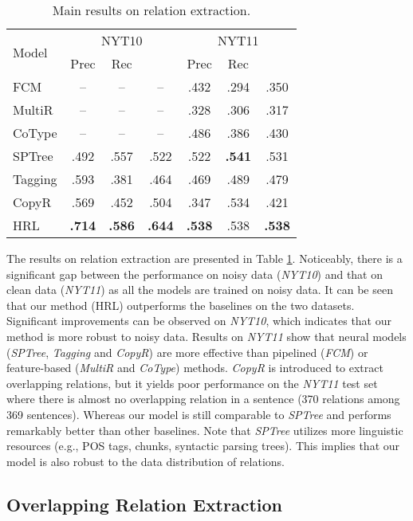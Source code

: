 \documentclass[letterpaper]{article} \usepackage{aaai19}  \usepackage{times}  \usepackage{helvet}  \usepackage{courier}  \usepackage{url}  \usepackage{graphicx}  \frenchspacing  \setlength{\pdfpagewidth}{8.5in}  \setlength{\pdfpageheight}{11in}  \usepackage{amsfonts}
\theoremstyle{definition}
\begin{document}
\begin{table}[!htb]
\centering
    \begin{tabular}{lcccccc}\toprule
        \multirow{2}{*}{Model} & \multicolumn{3}{c}{NYT10 
} & \multicolumn{3}{c}{NYT11}\\ & Prec & Rec &  & Prec & Rec & \\ \midrule
        FCM & -- & -- & -- & .432 & .294 & .350 \\MultiR & -- & -- & -- & .328 & .306 & .317 \\CoType & -- & -- & -- & .486 & .386 & .430 \\SPTree & .492 & .557 & .522 & .522 & \textbf{.541} & .531 \\Tagging & .593 & .381 & .464 & .469 & .489 & .479 \\CopyR & .569 & .452 & .504 & .347 & .534 & .421 \\
    \midrule
HRL & \textbf{.714} & \textbf{.586} & \textbf{.644} & \textbf{.538} & .538 & \textbf{.538} \\\bottomrule
    \end{tabular}
    \caption{Main results on relation extraction.}
    \label{main}
\end{table}

The results on relation extraction are presented in Table \ref{main}. Noticeably, there is a significant gap between the performance on noisy data (\textit{NYT10}) and that on clean data (\textit{NYT11}) as all the models are trained on noisy data. It can be seen that our method (HRL) outperforms the baselines on the two datasets. Significant improvements can be observed on \textit{NYT10}, which indicates that our method is more robust to noisy data. 
Results on \textit{NYT11} show that neural models (\textit{SPTree}, \textit{Tagging} and \textit{CopyR}) are more effective than pipelined (\textit{FCM}) or feature-based (\textit{MultiR} and \textit{CoType}) methods. 
\textit{CopyR} is introduced to extract overlapping relations, but it yields poor performance on the \textit{NYT11} test set where there is almost no overlapping relation in a sentence (370 relations among 369 sentences). Whereas our model is still comparable to \textit{SPTree} and performs remarkably better than other baselines. Note that \textit{SPTree} utilizes more linguistic resources (e.g., POS tags, chunks, syntactic parsing trees). This implies that our model is also robust to the data distribution of relations.

\subsection{Overlapping Relation Extraction}
\end{document}

